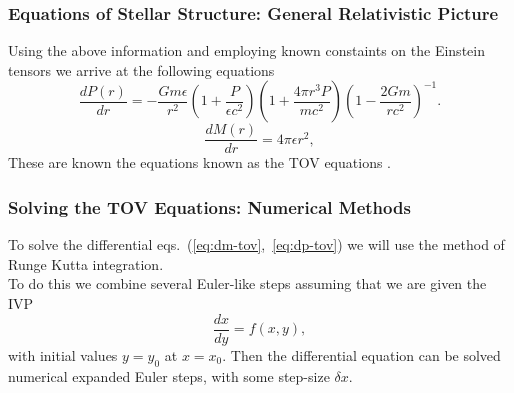 \documentclass{beamer}
\begin{document}
\begin{frame}
\frametitle{Equations of Stellar Structure: General Relativistic Picture}
Using the above information and employing known constaints on the Einstein tensors we arrive at the following equations
\begin{equation}\label{eq:dp-tov}
\frac{dP(r)}{dr} = -\frac{Gm\epsilon}{r^2}(1 + \frac{P}{\epsilon c^2})(1+\frac{4\pi r^3 P}{mc^2})(1-\frac{2Gm}{rc^2})^{-1}.
\end{equation}
\begin{equation}\label{eq:dm-tov}
\frac{dM(r)}{dr} = 4\pi \epsilon r^2,
\end{equation}
These are known the equations known as the TOV equations \cite{tov1939}.
\end{frame}
\begin{frame}
\frametitle{Solving the TOV Equations: Numerical Methods}
To solve the differential eqs.~(\ref{eq:dm-tov},~\ref{eq:dp-tov}) we will use the method of Runge Kutta integration. \\

To do this we combine several Euler-like steps assuming that we are given the IVP 
\begin{equation}\label{eq:dxdy}
\frac{dx}{dy} = f(x,y),
\end{equation}
with initial values $y = y_0$ at $x = x_0$. Then the differential equation can be solved numerical expanded Euler steps, with some step-size $\delta x$.
\end{frame}
\end{document}
